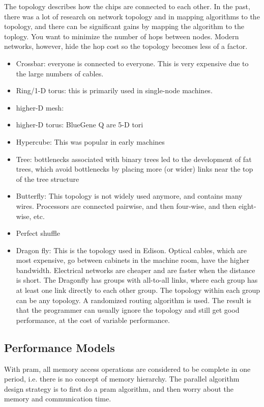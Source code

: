 \documentclass[10pt]{article}
\begin{document}
\begin{flushleft}
The topology describes how the chips are connected to each other. In the past, there was a lot of research on network topology and in mapping algorithms to the topology, and there can be significant gains by mapping the algorithm to the toplogy. You want to minimize the number of hops between nodes. Modern networks, however, hide the hop cost so the topology becomes less of a factor.

\begin{itemize}
\item Crossbar: everyone is connected to everyone. This is very expensive due to the large numbers of cables.
\item Ring/1-D torus: this is primarily used in single-node machines. 
\item higher-D mesh: 
\item higher-D torus: BlueGene Q are 5-D tori
\item Hypercube: This was popular in early machines
\item Tree: bottlenecks associated with binary trees led to the development of fat trees, which avoid bottlenecks by placing more (or wider) links near the top of the tree structure
\item Butterfly: This topology is not widely used anymore, and contains many wires. Processors are connected pairwise, and then four-wise, and then eight-wise, etc. 
\item Perfect shuffle
\item Dragon fly: This is the topology used in Edison. Optical cables, which are most expensive, go between cabinets in the machine room, have the higher bandwidth. Electrical networks are cheaper and are faster when the distance is short. The Dragonfly has groups with all-to-all links, where each group has at least one link directly to each other group. The topology within each group can be any topology. A randomized routing algorithm is used. The result is that the programmer can usually ignore the topology and still get good performance, at the cost of variable performance.
\end{itemize}

\subsection{Performance Models}

With \gls{pram}, all memory access operations are considered to be complete in one period, i.e. there is no concept of memory hierarchy. The parallel algorithm design strategy is to first do a \gls{pram} algorithm, and then worry about the memory and communication time. 


\end{flushleft}
\end{document}
